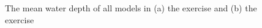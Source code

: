 \documentclass{isprs}
\begin{document}
\begin{figure}
\begin{center}
\caption{The mean water depth of all models in (a) the  exercise and (b) the  exercise}
\label{fig:mean_depth}
\end{center}
\end{figure}
%
\end{document}
